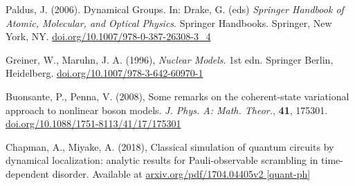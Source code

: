 \documentclass[12pt]{article}
\begin{document}
	\begin{thebibliography}{10}
	
	Paldus, J. (2006). Dynamical Groups. In: Drake, G. (eds) \textit{Springer Handbook of Atomic, Molecular, and Optical Physics}. Springer Handbooks. Springer, New York, NY. \href{https://doi.org/10.1007/978-0-387-26308-3\_4}{doi.org/10.1007/978-0-387-26308-3\_4}
	
	Greiner, W., Maruhn, J. A. (1996), \textit{Nuclear Models}. 1st edn. Springer Berlin, Heidelberg. \href{https://doi.org/10.1007/978-3-642-60970-1}{doi.org/10.1007/978-3-642-60970-1}
	
	Buonsante, P., Penna, V. (2008), Some remarks on the coherent-state variational approach to nonlinear boson models. \textit{J. Phys. A: Math. Theor.}, \textbf{41}, 175301. \href{https://doi.org/10.1088/1751-8113/41/17/175301}{doi.org/10.1088/1751-8113/41/17/175301}
	
	Chapman, A., Miyake, A. (2018), Classical simulation of quantum circuits by dynamical localization: analytic results for Pauli-observable scrambling in time-dependent disorder. Available at \href{https://arxiv.org/pdf/1704.04405v2}{arxiv.org/pdf/1704.04405v2 [quant-ph]}

	\end{thebibliography}	
	
\end{document}
